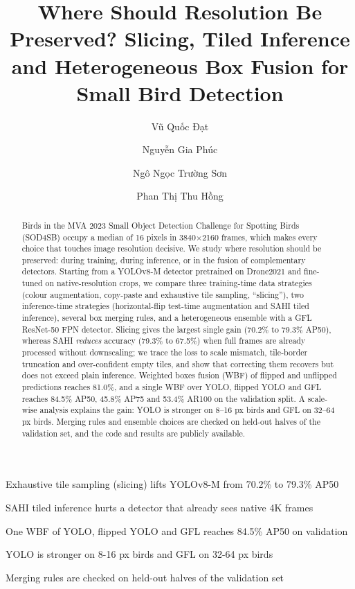 \documentclass[5p,a4paper]{elsarticle}
\begin{document}
\begin{frontmatter}

\title{Where Should Resolution Be Preserved? Slicing, Tiled Inference and Heterogeneous Box Fusion for Small Bird Detection}

\author[fpt]{Vũ Quốc Đạt}
\author[fpt]{Nguyễn Gia Phúc}
\author[fpt]{Ngô Ngọc Trường Sơn}
\author[fpt]{Phan Thị Thu Hồng}
\ead{[email]}

\begin{abstract}
Birds in the MVA 2023 Small Object Detection Challenge for Spotting Birds (SOD4SB) occupy a median of 16 pixels
in 3840$\times$2160 frames, which makes every choice that touches image resolution decisive. We study where
resolution should be preserved: during training, during inference, or in the fusion of complementary detectors.
Starting from a YOLOv8-M detector pretrained on Drone2021 and fine-tuned on native-resolution crops, we compare
three training-time data strategies (colour augmentation, copy-paste and exhaustive tile sampling, ``slicing''),
two inference-time strategies (horizontal-flip test-time augmentation and SAHI tiled inference), several box
merging rules, and a heterogeneous ensemble with a GFL ResNet-50 FPN detector. Slicing gives the largest single
gain (70.2\% to 79.3\% AP50), whereas SAHI \emph{reduces} accuracy (79.3\% to 67.5\%) when full frames are already
processed without downscaling; we trace the loss to scale mismatch, tile-border truncation and over-confident
empty tiles, and show that correcting them recovers but does not exceed plain inference. Weighted boxes fusion
(WBF) of flipped and unflipped predictions reaches 81.0\%, and a single WBF over YOLO, flipped YOLO and GFL
reaches 84.5\% AP50, 45.8\% AP75 and 53.4\% AR100 on the validation split. A scale-wise analysis explains the gain:
YOLO is stronger on 8--16 px birds and GFL on 32--64 px birds. Merging rules and ensemble choices are checked on
held-out halves of the validation set, and the code and results are publicly available.
\end{abstract}

\begin{highlights}
\item Exhaustive tile sampling (slicing) lifts YOLOv8-M from 70.2\% to 79.3\% AP50
\item SAHI tiled inference hurts a detector that already sees native 4K frames
\item One WBF of YOLO, flipped YOLO and GFL reaches 84.5\% AP50 on validation
\item YOLO is stronger on 8-16 px birds and GFL on 32-64 px birds
\item Merging rules are checked on held-out halves of the validation set
\end{highlights}


\end{frontmatter}
\end{document}
